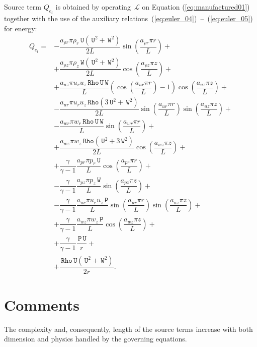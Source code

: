 \documentclass[10pt]{article}
\newcommand{\Lo}{\,\mathcal{L}}
\newcommand{\Rho}{\,\mathtt{Rho}}
\newcommand{\PP}{\,\mathtt{P}}
\newcommand{\U}{\,\mathtt{U}}
\newcommand{\W}{\,\mathtt{W}}
\begin{document}
Source term $Q_{e_t}$ is obtained by operating $\Lo$ on Equation  (\ref{eq:manufactured01}) together with the use of the  auxiliary relations~(\ref{eq:euler_04})~--~(\ref{eq:euler_05}) for energy:
\begin{equation}
 \begin{split}
 \displaystyle
Q_{e_t}  =
&-\dfrac{ a_{\rho r} \pi \rho_r \U(\U^2+\W^2) }{2L}\sin\left(\dfrac{a_{\rho r} \pi r}{L}\right)+ \\
&+\dfrac{ a_{\rho z} \pi \rho_z \W(\U^2+\W^2) }{2L}\cos\left(\dfrac{a_{\rho z} \pi z}{L}\right)+ \\
&+\dfrac{a_{uz} \pi u_r u_z \Rho \U \W }{L}\left( \cos\left(\dfrac{a_{ur} \pi r}{L}\right) -1 \right) \cos\left(\dfrac{a_{uz} \pi z}{L}\right)+ \\
&-\dfrac{a_{ur} \pi u_r u_z \Rho(3 \U^2+\W^2)}{2L} \sin\left(\dfrac{a_{ur} \pi r}{L}\right) \sin\left(\dfrac{a_{uz} \pi z}{L}\right)+ \\
&-\dfrac{a_{wr} \pi w_r \Rho \U \W }{L}\sin\left(\dfrac{a_{wr} \pi r}{L}\right)+ \\
&+\dfrac{a_{wz} \pi w_z \Rho(\U^2+3 \W^2) }{2L}\cos\left(\dfrac{a_{wz} \pi z}{L}\right)+ \\
&+\dfrac{\gamma}{\gamma-1}\dfrac{a_{pr} \pi p_r \U }{L} \cos\left(\dfrac{a_{pr} \pi r}{L}\right)+ \\
&-\dfrac{\gamma}{\gamma-1}\dfrac{ a_{pz} \pi p_z \W}{L} \sin\left(\dfrac{a_{pz} \pi z}{L}\right)+ \\
&-\dfrac{\gamma}{\gamma-1}\dfrac{a_{ur} \pi u_r u_z \PP }{L} \sin\left(\dfrac{a_{ur} \pi r}{L}\right) \sin\left(\dfrac{a_{uz} \pi z}{L}\right)+ \\
&+\dfrac{\gamma}{\gamma-1}\dfrac{ a_{wz} \pi w_z \PP}{L} \cos\left(\dfrac{a_{wz} \pi z}{L}\right)+ \\
&+\dfrac{\gamma}{\gamma-1} \dfrac{ \PP \U}{r}+\\
&+\dfrac{ \Rho \U(\U^2+\W^2)}{2r}   .
\end{split}
\end{equation}



\section{Comments}


The complexity and, consequently, length of the source terms increase with both dimension and physics handled by the governing equations.

\end{document}
